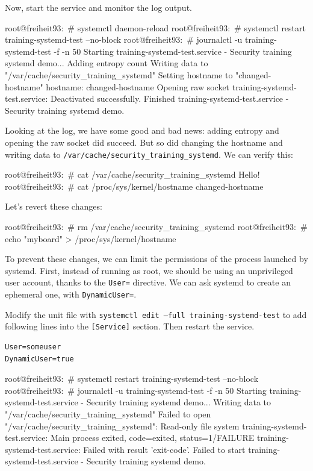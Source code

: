 Now, start the service and monitor the log output.

\begin{bashinput}
root@freiheit93:~# systemctl daemon-reload
root@freiheit93:~# systemctl restart training-systemd-test --no-block
root@freiheit93:~# journalctl -u training-systemd-test -f -n 50
Starting training-systemd-test.service - Security training systemd demo...
Adding entropy count
Writing data to "/var/cache/security_training_systemd"
Setting hostname to "changed-hostname"
hostname: changed-hostname
Opening raw socket
training-systemd-test.service: Deactivated successfully.
Finished training-systemd-test.service - Security training systemd demo.
\end{bashinput}

Looking at the log, we have some good and bad news: adding entropy and opening
the raw socket did succeed.
But so did changing the hostname and writing data to
\texttt{/var/cache/security\_training\_systemd}.
We can verify this:

\begin{bashinput}
root@freiheit93:~# cat /var/cache/security_training_systemd
Hello!
root@freiheit93:~# cat /proc/sys/kernel/hostname
changed-hostname
\end{bashinput}

Let's revert these changes:

\begin{bashinput}
root@freiheit93:~# rm /var/cache/security_training_systemd
root@freiheit93:~# echo "myboard" > /proc/sys/kernel/hostname
\end{bashinput}

To prevent these changes, we can limit the permissions of the process launched
by systemd.
First, instead of running as root, we should be using an unprivileged user
account, thanks to the \texttt{User=} directive.
We can ask systemd to create an ephemeral one, with \texttt{DynamicUser=}.

Modify the unit file with \texttt{systemctl edit --full training-systemd-test}
to add following lines into the \texttt{[Service]} section.
Then restart the service.

\begin{verbatim}
User=someuser
DynamicUser=true
\end{verbatim}

\begin{bashinput}
root@freiheit93:~# systemctl restart training-systemd-test --no-block
root@freiheit93:~# journalctl -u training-systemd-test -f -n 50
Starting training-systemd-test.service - Security training systemd demo...
Writing data to "/var/cache/security_training_systemd"
Failed to open "/var/cache/security_training_systemd": Read-only file system
training-systemd-test.service: Main process exited, code=exited, status=1/FAILURE
training-systemd-test.service: Failed with result 'exit-code'.
Failed to start training-systemd-test.service - Security training systemd demo.
\end{bashinput}


